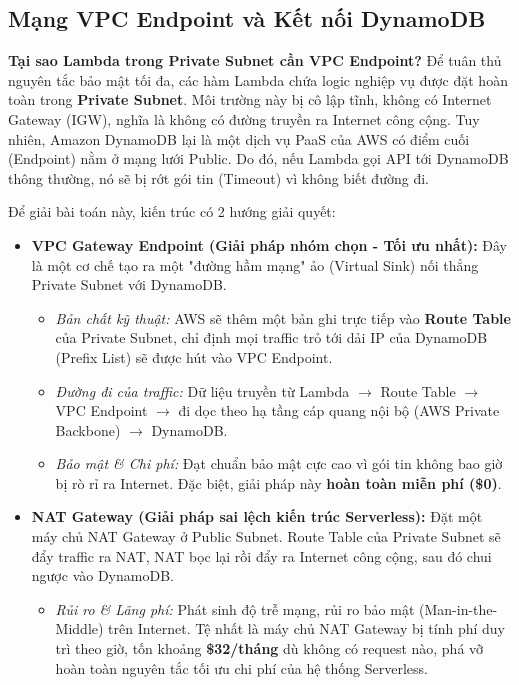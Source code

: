 \documentclass[13pt]{article}
\begin{document}
\subsection{Mạng VPC Endpoint và Kết nối DynamoDB}

\textbf{Tại sao Lambda trong Private Subnet cần VPC Endpoint?}
Để tuân thủ nguyên tắc bảo mật tối đa, các hàm Lambda chứa logic nghiệp vụ được đặt hoàn toàn trong \textbf{Private Subnet}. Môi trường này bị cô lập tĩnh, không có Internet Gateway (IGW), nghĩa là không có đường truyền ra Internet công cộng. Tuy nhiên, Amazon DynamoDB lại là một dịch vụ PaaS của AWS có điểm cuối (Endpoint) nằm ở mạng lưới Public. Do đó, nếu Lambda gọi API tới DynamoDB thông thường, nó sẽ bị rớt gói tin (Timeout) vì không biết đường đi.

Để giải bài toán này, kiến trúc có 2 hướng giải quyết:

\begin{itemize}
    \item \textbf{VPC Gateway Endpoint (Giải pháp nhóm chọn - Tối ưu nhất):} Đây là một cơ chế tạo ra một "đường hầm mạng" ảo (Virtual Sink) nối thẳng Private Subnet với DynamoDB.
    \begin{itemize}
        \item \textit{Bản chất kỹ thuật:} AWS sẽ thêm một bản ghi trực tiếp vào \textbf{Route Table} của Private Subnet, chỉ định mọi traffic trỏ tới dải IP của DynamoDB (Prefix List) sẽ được hút vào VPC Endpoint.
        \item \textit{Đường đi của traffic:} Dữ liệu truyền từ Lambda $\rightarrow$ Route Table $\rightarrow$ VPC Endpoint $\rightarrow$ đi dọc theo hạ tầng cáp quang nội bộ (AWS Private Backbone) $\rightarrow$ DynamoDB.
        \item \textit{Bảo mật \& Chi phí:} Đạt chuẩn bảo mật cực cao vì gói tin không bao giờ bị rò rỉ ra Internet. Đặc biệt, giải pháp này \textbf{hoàn toàn miễn phí (\$0)}.
    \end{itemize}
    \item \textbf{NAT Gateway (Giải pháp sai lệch kiến trúc Serverless):} Đặt một máy chủ NAT Gateway ở Public Subnet. Route Table của Private Subnet sẽ đẩy traffic ra NAT, NAT bọc lại rồi đẩy ra Internet công cộng, sau đó chui ngược vào DynamoDB.
    \begin{itemize}
        \item \textit{Rủi ro \& Lãng phí:} Phát sinh độ trễ mạng, rủi ro bảo mật (Man-in-the-Middle) trên Internet. Tệ nhất là máy chủ NAT Gateway bị tính phí duy trì theo giờ, tốn khoảng \textbf{\$32/tháng} dù không có request nào, phá vỡ hoàn toàn nguyên tắc tối ưu chi phí của hệ thống Serverless.
    \end{itemize}
\end{itemize}
\end{document}
